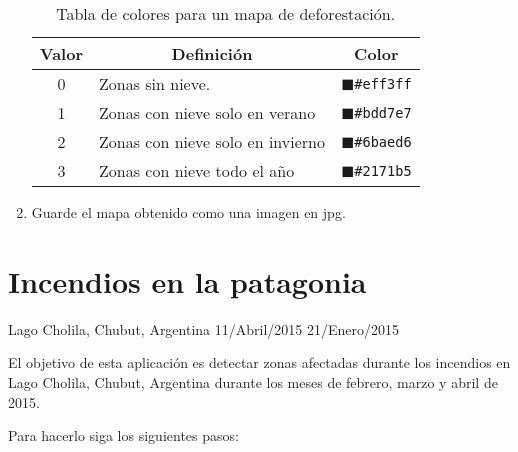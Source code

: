 \begin{enumerate}
\begin{table}[]
\centering
\begin{tabular}{@{}cll@{}}
\toprule
Valor & \multicolumn{1}{c}{Definición}        & \multicolumn{1}{c}{Color}          \\ \midrule
0      & Zonas sin nieve. & \textcolor{N1}{$\blacksquare$}\texttt{\#eff3ff} \\
1      & Zonas con nieve solo en verano   & \textcolor{N2}{$\blacksquare$}\texttt{\#bdd7e7} \\
2      & Zonas con nieve solo en invierno        & \textcolor{N3}{$\blacksquare$}\texttt{\#6baed6} \\
3      & Zonas con nieve todo el año        & \textcolor{N4}{$\blacksquare$}\texttt{\#2171b5} \\ \bottomrule
\end{tabular}
\caption{Tabla de colores para un mapa de deforestación.}
\label{tab:nieve}
\end{table}

\item Guarde el mapa obtenido como una imagen en jpg.
\end{enumerate}

\section{Incendios en la patagonia}

Lago Cholila, Chubut, Argentina
11/Abril/2015
21/Enero/2015

El objetivo de esta aplicación es detectar zonas afectadas durante los incendios en Lago Cholila, Chubut, Argentina durante los meses de febrero, marzo y abril de 2015.

Para hacerlo siga los siguientes pasos:

